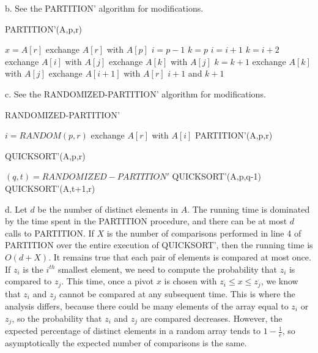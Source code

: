 \documentclass{article}
\begin{document}
b. See the PARTITION' algorithm for modifications. \\
\begin{algorithm}
\caption{PARTITION'(A,p,r)}
\begin{algorithmic}[1]
\State $x = A[r]$
\State exchange $A[r]$ with $A[p]$
\State $i=p-1$
\State $k = p$
		\State $i=i+1$
		\State $k = i+2$
		\State exchange $A[i]$ with $A[j]$
		\State exchange $A[k]$ with $A[j]$
	\EndIf
		\State $k = k+1$
		\State exchange $A[k]$ with $A[j]$
	\EndIf
\EndFor
\State exchange $A[i+1]$ with $A[r]$
\State \Return $i+1$ and $k+1$
\end{algorithmic}
\end{algorithm}

c. See the RANDOMIZED-PARTITION' algorithm for modifications.  
\begin{algorithm}
\caption{RANDOMIZED-PARTITION'}
\begin{algorithmic}[1]
\State $i=RANDOM(p,r)$
\State exchange $A[r]$ with $A[i]$
\State \Return PARTITION'(A,p,r)
\end{algorithmic}
\end{algorithm}

\begin{algorithm}
\caption{QUICKSORT'(A,p,r)}
\begin{algorithmic}[1]
	\State $(q,t) = RANDOMIZED-PARTITION'$
	\State QUICKSORT'(A,p,q-1)
	\State QUICKSORT'(A,t+1,r)
\EndIf
\end{algorithmic}
\end{algorithm}

d. Let $d$ be the number of distinct elements in $A$.  The running time is dominated by the time spent in the PARTITION procedure, and there can be at most $d$ calls to PARTITION.  If $X$ is the number of comparisons performed in line 4 of PARTITION over the entire execution of QUICKSORT', then the running time is $O(d+X)$. It remains true that each pair of elements is compared at most once. If $z_i$ is the $i^{th}$ smallest element, we need to compute the probability that $z_i$ is compared to $z_j$. This time, once a pivot $x$ is chosen with $z_i \leq x \leq z_j$, we know that $z_i$ and $z_j$ cannot be compared at any subsequent time. This is where the analysis differs, because there could be many elements of the array equal to $z_i$ or $z_j$, so the probability that $z_i$ and $z_j$ are compared decreases. However, the expected percentage of distinct elements in a random array tends to $1-\frac{1}{e}$, so asymptotically the expected number of comparisons is the same. \\
\end{document}
